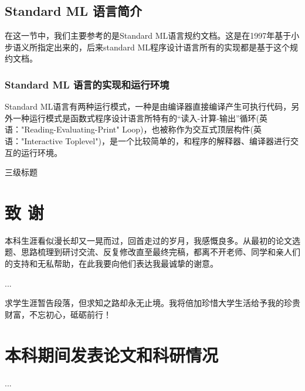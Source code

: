 \documentclass[openany,oneside]{book}
\theoremstyle{definition}
\theoremstyle{definition}
\begin{document}
	

	
	
\section{Standard ML 语言简介}
	在这一节中，我们主要参考的是Standard ML语言规约文档\cite{harper1986standard}。这是在1997年基于小步语义所指定出来的，后来standard ML程序设计语言所有的实现都是基于这个规约文档。 


\subsection{Standard ML 语言的实现和运行环境}
	Standard ML语言有两种运行模式，一种是由编译器直接编译产生可执行代码，另外一种运行模式是函数式程序设计语言所特有的“读入-计算-输出”循环(英语："Reading-Evaluating-Print" Loop)，也被称作为交互式顶层构件(英语："Interactive Toplevel")，是一个比较简单的，和程序的解释器、编译器进行交互的运行环境\cite{abelson1996structure}。
	

三级标题


\clearpage
{}
{}

\chapter*{致 \qquad 谢}
\thispagestyle{empty}
本科生涯看似漫长却又一晃而过，回首走过的岁月，我感慨良多。从最初的论文选题、思路梳理到研讨交流、反复修改直至最终完稿，都离不开老师、同学和亲人们的支持和无私帮助，在此我要向他们表达我最诚挚的谢意。


...

求学生涯暂告段落，但求知之路却永无止境。我将倍加珍惜大学生活给予我的珍贵财富，不忘初心，砥砺前行！
\chapter*{本科期间发表论文和科研情况}
\thispagestyle{empty}

...
\end{document}
